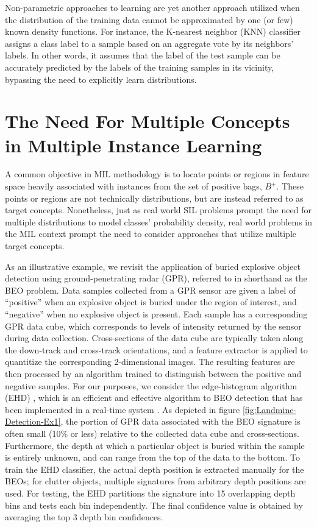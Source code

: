 \documentclass[12pt,dvips]{report}
\numberwithin{equation}{section}
\begin{document}
Non-parametric approaches to learning are yet another approach utilized
when the distribution of the training data cannot be approximated
by one (or few) known density functions. For instance, the K-nearest
neighbor (KNN) classifier \cite{coverhart1967} assigns a class label
to a sample based on an aggregate vote by its neighbors' labels. In
other words, it assumes that the label of the test sample can be accurately
predicted by the labels of the training samples in its vicinity, bypassing
the need to explicitly learn distributions.


\section{The Need For Multiple Concepts in Multiple Instance Learning}

A common objective in MIL methodology is to locate points or regions
in feature space heavily associated with instances from the set of positive bags,
$B^{+}$. These points or regions are not technically distributions, but 
are instead referred to as target concepts. Nonetheless, just as real
world SIL problems prompt the need for multiple distributions to model
classes' probability density, real world problems in the MIL context
prompt the need to consider approaches that utilize multiple target
concepts. 

As an illustrative example, we revisit the application of buried
explosive object detection using ground-penetrating radar (GPR), referred to
in shorthand as the BEO problem. Data samples
collected from a GPR sensor are given a label of ``positive'' when
an explosive object is buried under the region of interest, and ``negative''
when no explosive object is present. Each sample has a corresponding GPR data cube, which corresponds to levels of intensity returned by the sensor during data collection.  Cross-sections of the data cube are typically taken along the down-track and cross-track orientations, and a feature extractor is applied to quantitize the corresponding 2-dimensional images.  The resulting features are then processed by an algorithm trained to distinguish between the positive and negative samples.  For our purposes, we consider the edge-histogram algorithm
(EHD) \cite{wonparkpark2002}, which is an efficient and effective algorithm
to BEO detection that has been implemented in a real-time system
\cite{friguipaul2009}. As depicted in figure \ref{fig:Landmine-Detection-Ex1},
the portion of GPR data associated with the BEO signature is often
small (10\% or less) relative to the collected data cube and cross-sections. Furthermore,
the depth at which a particular object is buried within the sample
is entirely unknown, and can range from the top of the data to the bottom.
To train the EHD classifier, the actual depth position is extracted manually
for the BEOs; for clutter objects, multiple signatures from arbitrary
depth positions are used. For testing, the EHD partitions the signature
into 15 overlapping depth bins and tests each bin independently. The
final confidence value is obtained by averaging the top 3 depth bin
confidences. 
\end{document}
